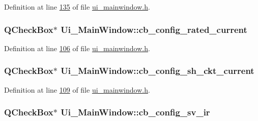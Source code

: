 Definition at line \hyperlink{a00052_source_l00135}{135} of file \hyperlink{a00052_source}{ui\+\_\+mainwindow.\+h}.

\hypertarget{a00027_af4863849ff58931ae3a38aa5b40b8158}{
\subsubsection[{cb\+\_\+config\+\_\+rated\+\_\+current}]{\setlength{\rightskip}{0pt plus 5cm}Q\+Check\+Box$\ast$ Ui\+\_\+\+Main\+Window\+::cb\+\_\+config\+\_\+rated\+\_\+current}}\label{a00027_af4863849ff58931ae3a38aa5b40b8158}


Definition at line \hyperlink{a00052_source_l00106}{106} of file \hyperlink{a00052_source}{ui\+\_\+mainwindow.\+h}.

\hypertarget{a00027_a541de6e510677e572ab233f7ecc25e2c}{
\subsubsection[{cb\+\_\+config\+\_\+sh\+\_\+ckt\+\_\+current}]{\setlength{\rightskip}{0pt plus 5cm}Q\+Check\+Box$\ast$ Ui\+\_\+\+Main\+Window\+::cb\+\_\+config\+\_\+sh\+\_\+ckt\+\_\+current}}\label{a00027_a541de6e510677e572ab233f7ecc25e2c}


Definition at line \hyperlink{a00052_source_l00109}{109} of file \hyperlink{a00052_source}{ui\+\_\+mainwindow.\+h}.

\hypertarget{a00027_a4db3ccfbbf8c5222dd2f042d3073bbe8}{
\subsubsection[{cb\+\_\+config\+\_\+sv\+\_\+ir}]{\setlength{\rightskip}{0pt plus 5cm}Q\+Check\+Box$\ast$ Ui\+\_\+\+Main\+Window\+::cb\+\_\+config\+\_\+sv\+\_\+ir}}\label{a00027_a4db3ccfbbf8c5222dd2f042d3073bbe8}


